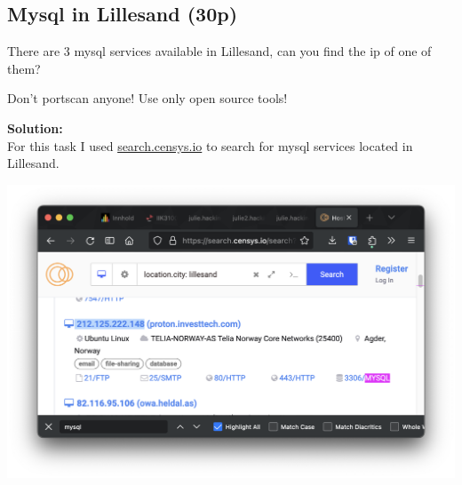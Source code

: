 \newpage
\subsection{Mysql in Lillesand (30p)}
\addtocounter{points}{30}
There are 3 mysql services available in Lillesand, can you find the ip of one of them?

Don't portscan anyone! Use only open source tools!

\textbf{Solution:}\\
For this task I used \url{search.censys.io} to search for mysql services located in Lillesand.

\begin{center}
    \includegraphics[width=15cm]{img/Technical information gathering/Mysql Lillesand/Screenshot 2023-11-24 at 11.16.26.png}
\end{center}
